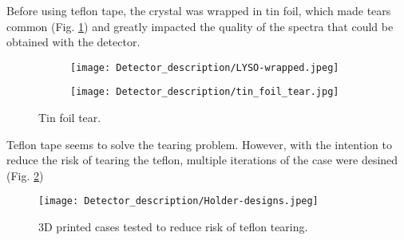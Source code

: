 Before using teflon tape, the crystal was wrapped in tin foil, which made tears common (Fig. \ref{fig:tin_foil_tear}) and greatly impacted the quality of the spectra that could be obtained with the detector. 

\begin{figure}[H]
    \centering
    \begin{subfigure}[t]{0.45\textwidth}
      \texttt{[image: Detector\_description/LYSO-wrapped.jpeg]}
    \end{subfigure}
    \begin{subfigure}[t]{0.45\textwidth}
      \texttt{[image: Detector\_description/tin\_foil\_tear.jpg]}
    \end{subfigure}
    \caption{\label{fig:tin_foil_tear}Tin foil tear.}
\end{figure}

Teflon tape seems to solve the tearing problem. However, with the intention to reduce the risk of tearing the teflon, multiple iterations of the case were desined (Fig. \ref{fig:3d_previous_desings})

\begin{figure}[H]
    \centering
    \texttt{[image: Detector\_description/Holder-designs.jpeg]}
    \caption{3D printed cases tested to reduce risk of teflon tearing.}
    \label{fig:3d_previous_desings}
\end{figure}


